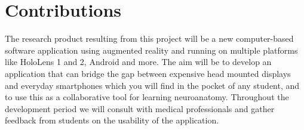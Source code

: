 
\section{Contributions}

The research product resulting from this project will be a new computer-based software application using augmented reality and running on multiple platforms like HoloLens 1 and 2, Android and more. The aim will be to develop an application that can bridge the gap between expensive head mounted displays and everyday smartphones which you will find in the pocket of any student, and to use this as a collaborative tool for learning neuroanatomy. Throughout the development period we will consult with medical professionals and gather feedback from students on the usability of the application.



